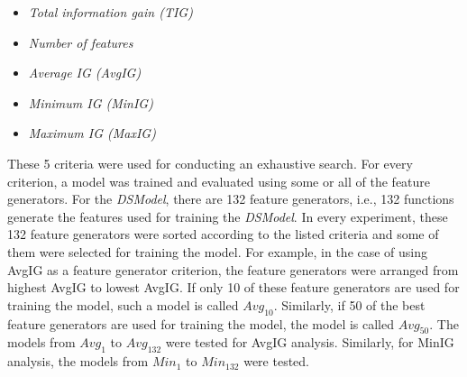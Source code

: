 \begin{itemize}

\item \textit{Total information gain (TIG)}

\item \textit{Number of features}

\item \textit{Average IG (AvgIG)}

\item \textit{Minimum IG (MinIG)}

\item \textit{Maximum IG (MaxIG)}

\end{itemize}


These 5 criteria were used for conducting an exhaustive search. For every criterion, a model was trained and evaluated using some or all of the feature generators. For the \textit{DSModel}, there are 132 feature generators, i.e., 132 functions generate the features used for training the \textit{DSModel}. In every experiment, these 132 feature generators were sorted according to the listed criteria and some of them were selected for training the model. For example, in the case of using AvgIG as a feature generator criterion, the feature generators were arranged from highest AvgIG to lowest AvgIG. If only 10 of these feature generators are used for training the model, such a model is called $Avg_{10}$. Similarly, if 50 of the best feature generators are used for training the model, the model is called $Avg_{50}$. The models from $Avg_1$ to $Avg_{132}$ were tested for AvgIG analysis. Similarly, for MinIG analysis, the models from $Min_{1}$ to $Min_{132}$ were tested.

